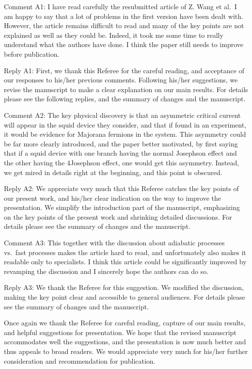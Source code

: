 \documentclass[11pt]{article}
\begin{document}
Comment A1: I have read carefully the resubmitted article of Z. Wang et
al.~I am happy to say that a lot of problems in the first version have
been dealt with. However, the article remains difficult to read and many
of the key points are not explained as well as they could be. Indeed, it
took me some time to really understand what the authors have done. I
think the paper still needs to improve before publication.

Reply A1: First, we thank this Referee for the careful reading, and
acceptance of our responses to his/her previous comments. Following
his/her suggestions, we revise the manuscript to make a clear
explanation on our main results. For details please see the following
replies, and the summary of changes and the manuscript.

Comment A2: The key physical discovery is that an asymmetric critical
current will appear in the squid device they consider, and that if found
in an experiment, it would be evidence for Majorana fermions in the
system. This asymmetry could be far more clearly introduced, and the
paper better motivated, by first saying that if a squid device with one
branch having the normal Josephson effect and the other having the
4\pi Josephson effect, one would get this asymmetry. Instead, we get
mired in details right at the beginning, and this point is obscured.

Reply A2: We appreciate very much that this Referee catches the key
points of our present work, and his/her clear indication on the way to
improve the presentation. We simplify the introduction part of the
manuscript, emphasizing on the key points of the present work and
shrinking detailed discussions. For details please see the summary of
changes and the manuscript.

Comment A3: This together with the discussion about adiabatic processes
vs.~fast processes makes the article hard to read, and unfortunately
also makes it readable only to specialists. I think this article could
be significantly improved by revamping the discussion and I sincerely
hope the authors can do so.

Reply A3: We thank the Referee for this suggestion. We modified the
discussion, making the key point clear and accessible to general
audiences. For details please see the summary of changes and the
manuscript.

Once again we thank the Referee for careful reading, capture of our main
results, and helpful suggestions for presentation. We hope that the
revised manuscript accommodates well the suggestions, and the
presentation is now much better and thus appeals to broad readers. We
would appreciate very much for his/her further consideration and
recommendation for publication.
\end{document}
